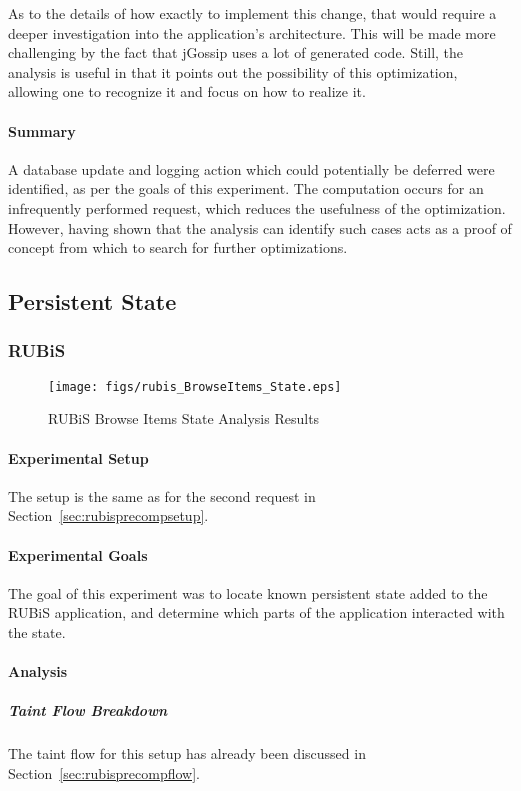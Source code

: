 \documentclass[msc,oneside]{ubcthesis}
\begin{document}
As to the details of how exactly to implement this change, that would require a deeper investigation into the application's architecture. This will be made more challenging by the fact that jGossip uses a lot of generated code. Still, the analysis is useful in that it points out the possibility of this optimization, allowing one to recognize it and focus on how to realize it.

\paragraph{Summary}
A database update and logging action which could potentially be deferred were identified, as per the goals of this experiment. The computation occurs for an infrequently performed request, which reduces the usefulness of the optimization. However, having shown that the analysis can identify such cases acts as a proof of concept from which to search for further optimizations.

\subsection{Persistent State}
\label{ana:pers}
\subsubsection{RUBiS}

\begin{sidewaysfigure}
\centering
\scalebox{0.5}
{\texttt{[image: figs/rubis\_BrowseItems\_State.eps]}}
\caption{RUBiS Browse Items State Analysis Results} 
\label{fig:browseitemsstate}
\end{sidewaysfigure}

\paragraph{Experimental Setup}
The setup is the same as for the second request in Section~\ref{sec:rubisprecompsetup}.

\paragraph{Experimental Goals}
The goal of this experiment was to locate known persistent state added to the RUBiS application, and determine which parts of the application interacted with the state.

\paragraph{Analysis}
\subparagraph{Taint Flow Breakdown}
The taint flow for this setup has already been discussed in Section~\ref{sec:rubisprecompflow}.
\end{document}
